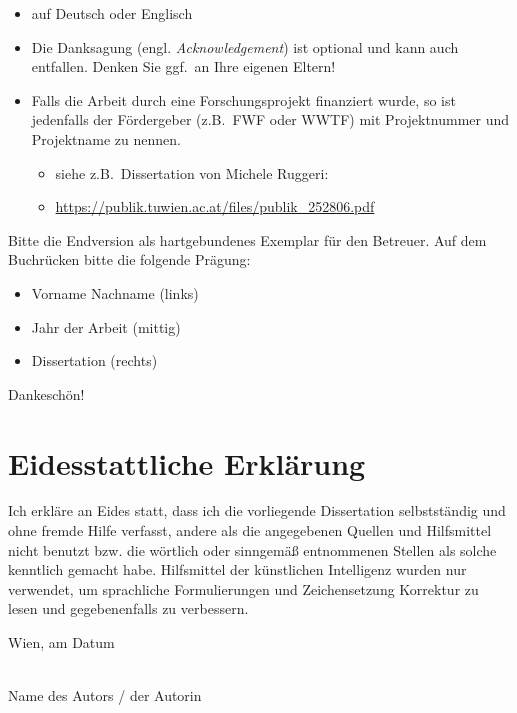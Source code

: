 \begin{itemize}
  \item auf Deutsch oder Englisch
  \item Die Danksagung (engl. {\em Acknowledgement}) ist optional und kann auch entfallen. Denken Sie ggf.\ an Ihre eigenen Eltern!

  \item Falls die Arbeit durch eine Forschungsprojekt finanziert wurde, so ist jedenfalls der Fördergeber (z.B.\ FWF oder WWTF) mit Projektnummer und
    Projektname zu nennen.
    \begin{itemize}
      \item siehe z.B.\ Dissertation von Michele Ruggeri:
      \item[] \href{https://publik.tuwien.ac.at/files/publik_252806.pdf}{\ttfamily https://publik.tuwien.ac.at/files/publik\_252806.pdf}
    \end{itemize}

\end{itemize}

\vfill

Bitte die Endversion als hartgebundenes Exemplar für den Betreuer. Auf dem Buchrücken bitte die folgende Prägung:
\begin{itemize}
  \item Vorname Nachname (links)
  \item Jahr der Arbeit (mittig)
  \item Dissertation (rechts)
\end{itemize}
Dankeschön!

\cleardoublepage


\chapter*{Eidesstattliche Erkl\"arung}
\thispagestyle{empty}

\vspace*{2cm}

Ich erkl\"are an Eides statt, dass ich die vorliegende Dissertation selbstst\"andig und ohne fremde Hilfe verfasst, andere als die angegebenen
Quellen und Hilfsmittel nicht benutzt bzw. die w\"ortlich oder sinngem\"a{\ss} entnommenen Stellen als solche kenntlich gemacht habe.
Hilfsmittel der künstlichen Intelligenz wurden nur verwendet,
um sprachliche Formulierungen und Zeichensetzung Korrektur zu lesen und gegebenenfalls zu verbessern.

\vspace*{3cm}

\noindent
Wien, am {\color{change}Datum} %
%
\hfill
%
\begin{minipage}[t]{5cm}
  \centering
  \underline{\hspace*{5cm}}\\
  \small\color{change}Name des Autors / der Autorin
\end{minipage}

\cleardoublepage